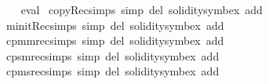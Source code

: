 \begin{isabellebody}
%
\isadelimproof
\ \ %
\endisadelimproof
%
\isatagproof
{}\isamarkupfalse%
\ eval%
\endisatagproof
{\isafoldproof}%
%
\isadelimproof
\isanewline
%
\endisadelimproof
\isanewline
{}\isamarkupfalse%
\ copyRec{\isachardot}{\kern0pt}simps\ {\isacharbrackleft}{\kern0pt}simp\ del{\isacharcomma}{\kern0pt}\ solidity{\isacharunderscore}{\kern0pt}symbex\ add{\isacharbrackright}{\kern0pt}\isanewline
{}\isamarkupfalse%
\ minitRec{\isachardot}{\kern0pt}simps\ {\isacharbrackleft}{\kern0pt}simp\ del{\isacharcomma}{\kern0pt}\ solidity{\isacharunderscore}{\kern0pt}symbex\ add{\isacharbrackright}{\kern0pt}\isanewline
{}\isamarkupfalse%
\ cpm{}mrec{\isachardot}{\kern0pt}simps\ {\isacharbrackleft}{\kern0pt}simp\ del{\isacharcomma}{\kern0pt}\ solidity{\isacharunderscore}{\kern0pt}symbex\ add{\isacharbrackright}{\kern0pt}\isanewline
{}\isamarkupfalse%
\ cps{}mrec{\isachardot}{\kern0pt}simps\ {\isacharbrackleft}{\kern0pt}simp\ del{\isacharcomma}{\kern0pt}\ solidity{\isacharunderscore}{\kern0pt}symbex\ add{\isacharbrackright}{\kern0pt}\isanewline
{}\isamarkupfalse%
\ cpm{}srec{\isachardot}{\kern0pt}simps\ {\isacharbrackleft}{\kern0pt}simp\ del{\isacharcomma}{\kern0pt}\ solidity{\isacharunderscore}{\kern0pt}symbex\ add{\isacharbrackright}{\kern0pt}\isanewline
%
\isadelimtheory
\isanewline
%
\endisadelimtheory
%
\isatagtheory
{}\isamarkupfalse%
%
\endisatagtheory
{\isafoldtheory}%
%
\isadelimtheory
%
\endisadelimtheory
%
\end{isabellebody}%
\endinput
